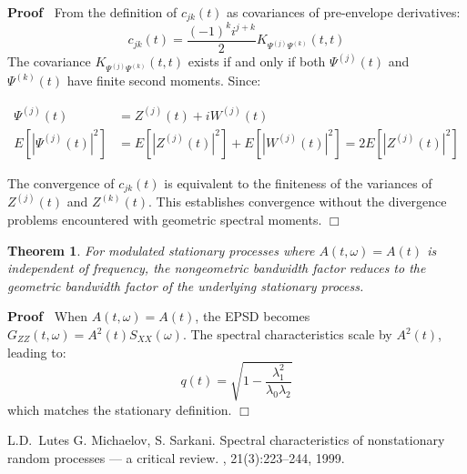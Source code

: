 \documentclass{article}
\newcommand{\tmtextit}[1]{\text{{\itshape{#1}}}}
\newenvironment{proof}{\noindent\textbf{Proof\ }}{\hspace*{\fill}$\Box$\medskip}
\newtheorem{theorem}{Theorem}
\begin{document}
\begin{proof}
  From the definition of $c_{jk} (t)$ as covariances of pre-envelope
  derivatives:
  \begin{equation}
    c_{jk} (t) = \frac{(- 1)^k i^{j + k}}{2} K_{\Psi^{(j)} \Psi^{(k)}} (t, t)
  \end{equation}
  The covariance $K_{\Psi^{(j)} \Psi^{(k)}} (t, t)$ exists if and only if both
  $\Psi^{(j)} (t)$ and $\Psi^{(k)} (t)$ have finite second moments. Since:
  
  \begin{align}
    \Psi^{(j)} (t) & = Z^{(j)} (t) + iW^{(j)} (t) \\
    E [| \Psi^{(j)} (t) |^2] & = E [|Z^{(j)} (t) |^2] + E [|W^{(j)} (t) |^2] =
    2 E [|Z^{(j)} (t) |^2] 
  \end{align}
  
  The convergence of $c_{jk} (t)$ is equivalent to the finiteness of the
  variances of $Z^{(j)} (t)$ and $Z^{(k)} (t)$. This establishes convergence
  without the divergence problems encountered with geometric spectral moments.
\end{proof}

\begin{theorem}
  For modulated stationary processes where $A (t, \omega) = A (t)$ is
  independent of frequency, the nongeometric bandwidth factor reduces to the
  geometric bandwidth factor of the underlying stationary process.
\end{theorem}

\begin{proof}
  When $A (t, \omega) = A (t)$, the EPSD becomes $G_{ZZ} (t, \omega) = A^2 (t)
  S_{XX} (\omega)$. The spectral characteristics scale by $A^2 (t)$, leading
  to:
  \begin{equation}
    q (t) = \sqrt{1 - \frac{\lambda_1^2}{\lambda_0 \lambda_2}}
  \end{equation}
  which matches the stationary definition.
\end{proof}

\begin{thebibliography}{1}
  L.D.~Lutes
  G. Michaelov, S. Sarkani. {\newblock}Spectral characteristics of
  nonstationary random processes --- a critical review.
  {\newblock}\tmtextit{Structural Safety}, 21(3):223--244, 1999.{\newblock}
\end{thebibliography}
\end{document}
